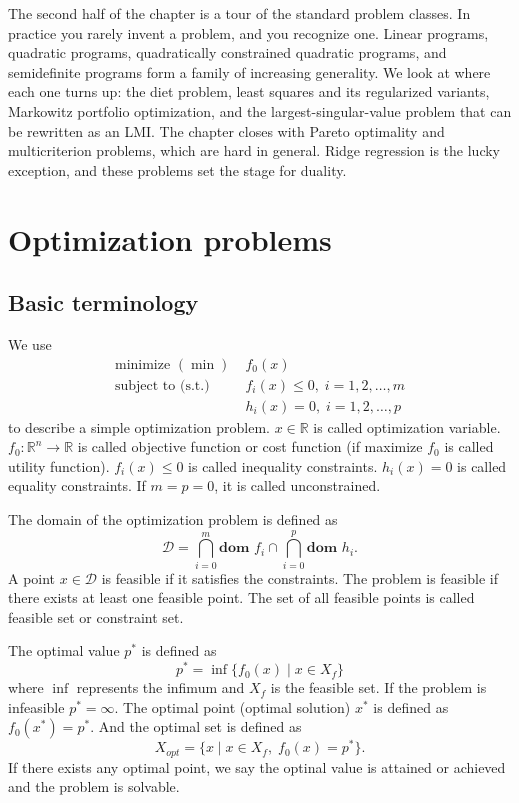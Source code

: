 \documentclass[lang=en,color=blue,mode=fancy,titlestyle=hang]{elegantbook}
\begin{document}
The second half of the chapter is a tour of the standard problem classes. In practice you
rarely invent a problem, and you recognize one. Linear programs, quadratic programs,
quadratically constrained quadratic programs, and semidefinite programs form a family of
increasing generality. We look at where each one turns up: the diet problem, least squares
and its regularized variants, Markowitz portfolio optimization, and the
largest-singular-value problem that can be rewritten as an LMI. The chapter closes with
Pareto optimality and multicriterion problems, which are hard in general. Ridge regression
is the lucky exception, and these problems set the stage for duality.


\section{Optimization problems}
\subsection{Basic terminology}
We use
\begin{align}
  \text{minimize } (\min) \; &f_0(x) \nonumber\\
  \text{subject to (s.t.)}\; &f_i(x) \leq 0, \; i = 1, 2, \ldots, m \\
  &h_i(x) = 0, \; i = 1, 2, \ldots, p \nonumber
\end{align}
to describe a simple optimization problem. $x \in \mathbb{R}$ is called optimization
variable. $f_0: \mathbb{R}^n \rightarrow \mathbb{R}$ is called objective function or
cost function (if maximize $f_0$ is called utility function). $f_i(x) \leq 0$ is called
inequality constraints. $h_i(x) = 0$ is called equality constraints. If $m = p = 0$, it
is called unconstrained.

The domain of the optimization problem is defined as
\[
\mathcal{D} = \bigcap_{i = 0}^m \textbf{dom } f_i \cap \bigcap_{i = 0}^p \textbf{dom } h_i.
\]
A point $x \in \mathcal{D}$ is feasible if it satisfies the constraints. The problem is
feasible if there exists at least one feasible point. The set of all feasible points is called
feasible set or constraint set.

The optimal value $p^*$ is defined as
\[
p^* = \inf \{f_0(x) \;|\; x \in X_f\}
\]
where $\inf$ represents the infimum and $X_f$ is the feasible set. If the problem is
infeasible $p^* = \infty$. The optimal point (optimal solution) $x^*$ is defined as
$f_0(x^*) = p^*$. And the optimal set is defined as
\[
X_{opt} = \{x \;|\; x \in X_f, \; f_0(x) = p^*\}.
\]
If there exists any optimal point, we say the optinal value is attained or achieved and
the problem is solvable.
\end{document}
